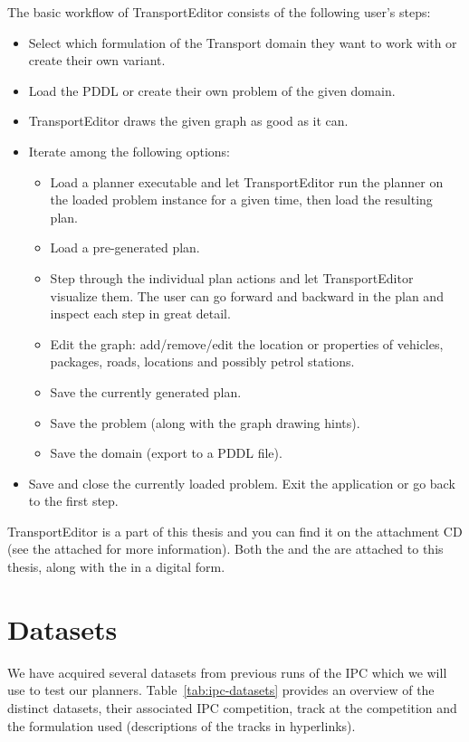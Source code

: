The basic workflow of TransportEditor consists of the following user's steps:
\begin{itemize}
\item Select which formulation of the Transport domain they want to work with or create their own variant.
\item Load the PDDL or create their own problem of the given domain.
\item TransportEditor draws the given graph as good as it can.
\item Iterate among the following options:
\begin{itemize}
\item Load a planner executable and let TransportEditor run the planner on the loaded problem instance for a given time, then load the resulting plan.
\item Load a pre-generated plan.
\item Step through the individual plan actions and let TransportEditor visualize them.
The user can go forward and backward in the plan and inspect each step in great detail.
\item Edit the graph: add/remove/edit the location or properties of vehicles, packages, roads, locations and possibly petrol stations.
\item Save the currently generated plan.
\item Save the problem (along with the graph drawing hints).
\item Save the domain (export to a PDDL file).
\end{itemize}
\item Save and close the currently loaded problem. Exit the application or go back to the first step.
\end{itemize}

TransportEditor is a part of this thesis and you can find it on the attachment CD (see the attached  for more information). Both the  and
the  are attached to this thesis, along with the  in a digital form.

\section{Datasets}

We have acquired several datasets from previous runs of the IPC which we will use to test our planners.
Table~\ref{tab:ipc-datasets} provides an overview of the distinct datasets, their associated IPC competition, track at the competition and the formulation used (descriptions of the tracks in hyperlinks).

